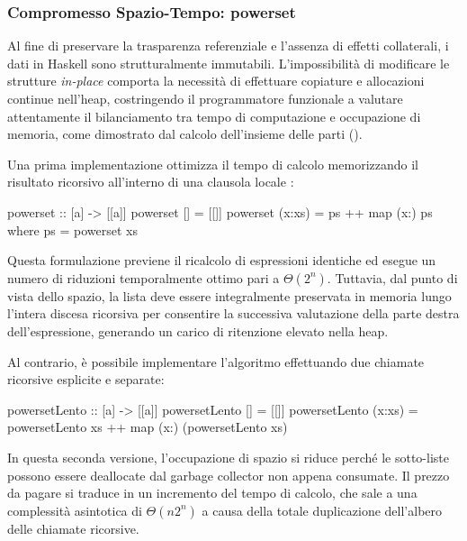 \subsubsection{Compromesso Spazio-Tempo: powerset}
Al fine di preservare la trasparenza referenziale e l'assenza di effetti collaterali, i dati in Haskell sono strutturalmente immutabili. L'impossibilità di modificare le strutture \textit{in-place} comporta la necessità di effettuare copiature e allocazioni continue nell'heap, costringendo il programmatore funzionale a valutare attentamente il bilanciamento tra tempo di computazione e occupazione di memoria, come dimostrato dal calcolo dell'insieme delle parti ().

Una prima implementazione ottimizza il tempo di calcolo memorizzando il risultato ricorsivo all'interno di una clausola locale :

\begin{haskellbox}{}
powerset :: [a] -> [[a]]
powerset []     = [[]]
powerset (x:xs) = ps ++ map (x:) ps
  where ps = powerset xs
\end{haskellbox}

Questa formulazione previene il ricalcolo di espressioni identiche ed esegue un numero di riduzioni temporalmente ottimo pari a $\Theta(2^n)$. Tuttavia, dal punto di vista dello spazio, la lista  deve essere integralmente preservata in memoria lungo l'intera discesa ricorsiva per consentire la successiva valutazione della parte destra dell'espressione, generando un carico di ritenzione elevato nella heap.

Al contrario, è possibile implementare l'algoritmo effettuando due chiamate ricorsive esplicite e separate:

\begin{haskellbox}{}
powersetLento :: [a] -> [[a]]
powersetLento []     = [[]]
powersetLento (x:xs) = powersetLento xs ++ map (x:) (powersetLento xs)
\end{haskellbox}

In questa seconda versione, l'occupazione di spazio si riduce perché le sotto-liste possono essere deallocate dal garbage collector non appena consumate. Il prezzo da pagare si traduce in un incremento del tempo di calcolo, che sale a una complessità asintotica di $\Theta(n 2^n)$ a causa della totale duplicazione dell'albero delle chiamate ricorsive.

